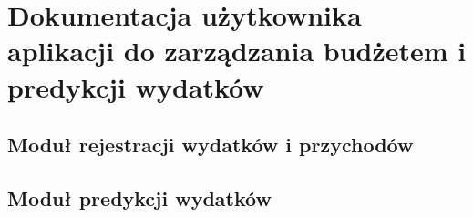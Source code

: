 \chapter{Dokumentacja użytkownika aplikacji do zarządzania budżetem i predykcji wydatków}
\section{Moduł rejestracji wydatków i przychodów}
\section{Moduł predykcji wydatków}